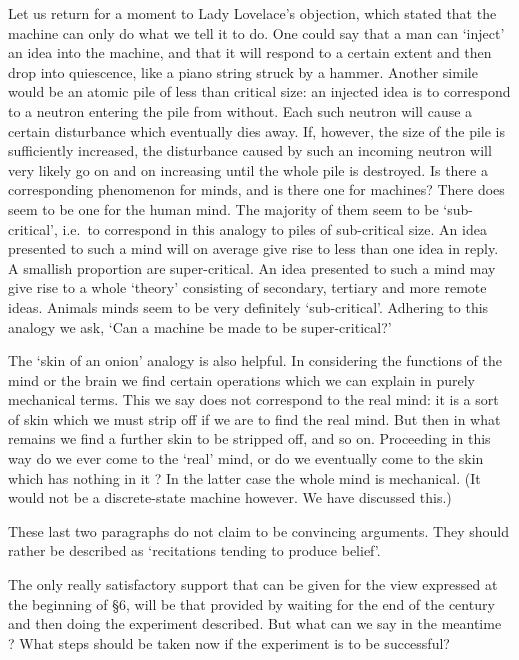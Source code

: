 \documentclass[10pt]{article} %
\begin{document}
Let us return for a moment to Lady Lovelace's objection, which stated that the machine can only do what we tell it to do. One could say that a man can `inject' an idea into the machine, and that it will respond to a certain extent and then drop into quiescence, like a piano string struck by a hammer. Another simile would be an atomic pile of less than critical size: an injected idea is to correspond to a neutron entering the pile from without. Each such neutron will cause a certain disturbance which eventually dies away. If, however, the size of the pile is sufficiently increased, the disturbance caused by such an incoming neutron will very likely go on and on increasing until the whole pile is destroyed. Is there a corresponding phenomenon for minds, and is there one for machines? There does seem to be one for the human mind. The majority of them seem to be `sub-critical', i.e.~to correspond in this analogy to piles of sub-critical size. An idea presented to such a mind will on average give rise to less than one idea in reply. A smallish proportion are super-critical. An idea presented to such a mind may give rise to a whole `theory' consisting of secondary, tertiary and more remote ideas. Animals minds seem to be very definitely `sub-critical'. Adhering to this analogy we ask, `Can a machine be made to be super-critical?'

The `skin of an onion' analogy is also helpful. In considering the functions of the mind or the brain we find certain operations which we can explain in purely mechanical terms. This we say does not correspond to the real mind: it is a sort of skin which we must strip off if we are to find the real mind. But then in what remains we find a further skin to be stripped off, and so on. Proceeding in this way do we ever come to the `real' mind, or do we eventually come to the skin which has nothing in it ? In the latter case the whole mind is mechanical. (It would not be a discrete-state machine however. We have discussed this.)

These last two paragraphs do not claim to be convincing arguments. They should rather be described as `recitations tending to produce belief'.

The only really satisfactory support that can be given for the view expressed at the beginning of \S 6, will be that provided by waiting for the end of the century and then doing the experiment described. But what can we say in the meantime ? What steps should be taken now if the experiment is to be successful?
\end{document}
